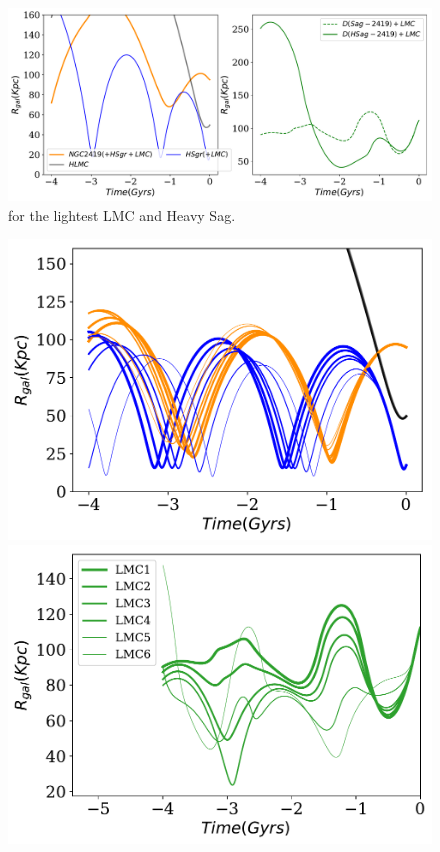 \documentclass[14pt]{article}
\begin{document}
\begin{figure}[H]
\centering
\includegraphics[scale=0.5]{../exploratory_code/NGC2419_sphMWHSGRLMC.pdf}
\caption{for the lightest LMC and Heavy Sag.}
\end{figure}

\begin{figure}[H]
\centering
\begin{minipage}{0.49\linewidth}
\includegraphics[scale=0.5]{../exploratory_code/gal_orbits_all_LMCs.pdf}
\end{minipage}
\begin{minipage}{0.45\linewidth}
\includegraphics[scale=0.5]{../exploratory_code/d_rel_all_LMCs.pdf}
\end{minipage}
\end{figure}
\end{document}
